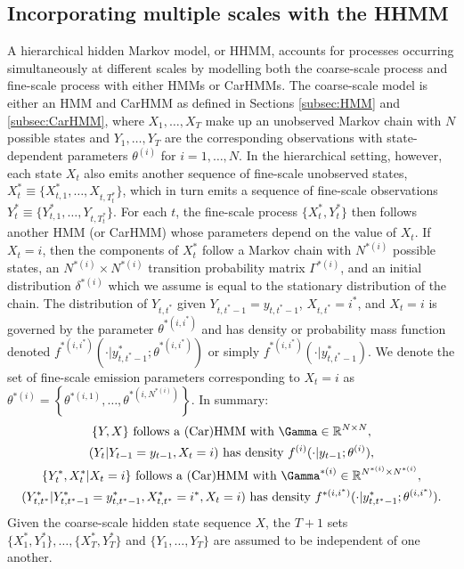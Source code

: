 \subsection{Incorporating multiple scales with the HHMM}
\label{subsec:HHMM}

A hierarchical hidden Markov model, or HHMM, accounts for processes occurring simultaneously at different scales by modelling both the coarse-scale process and fine-scale process with either HMMs \citep{Barajas:2017,Adam:2019} or CarHMMs. The coarse-scale model is either an HMM and CarHMM as defined in Sections \ref{subsec:HMM} and \ref{subsec:CarHMM}, where $X_1, \ldots, X_T$ make up an unobserved Markov chain with $N$ possible states and $Y_1,\ldots, Y_T$ are the corresponding observations with state-dependent parameters $\theta^{(i)}$ for $i = 1,\ldots,N$.   
%
In the hierarchical setting, however, each state $X_t$ also emits another sequence of fine-scale unobserved states, $X_t^* \equiv \{X_{t,1}^*,\ldots, X_{t,T_t^*}\}$, which in turn emits a sequence of fine-scale observations $Y_t^* \equiv \{Y_{t,1}^*,\ldots, Y_{t,T_t^*}\}$. For each $t$, the fine-scale process $\{X_t^*, Y_t^*\}$ then follows another HMM (or CarHMM) whose parameters depend on the value of $X_t$. If $X_t = i$, then the components of $X_t^*$ follow a Markov chain with $N^{*(i)}$ possible states, an $N^{*(i)} \times N^{*(i)}$ transition probability matrix $\Gamma^{*(i)}$, and an initial distribution $\delta^{*(i)}$ which we assume is equal to the stationary distribution of the chain. The distribution of $Y_{t,t^*}$ given $Y_{t,t^*-1} = y_{t,t^*-1}$, $X_{t,t^*}=i^*$, and $X_t=i$ is governed by the parameter $\theta^{*(i,i^*)}$ and has density or probability mass function denoted $f^{*(i,i^*)}\left(\cdot|y^*_{t,t^*-1}; \theta^{*(i,i^*)}\right)$ or simply $f^{*(i,i^*)}(\cdot|y^*_{t,t^*-1})$. We denote the set of fine-scale emission parameters corresponding to $X_t=i$ as $\theta^{*(i)}=\left\{\theta^{*(i,1)}, \ldots, \theta^{*\left(i,N^{*(i)}\right)}\right\}$. In summary:
%
%
\begin{gather*}
    \{Y, X\} \text{ follows a (Car)HMM with } \Gamma \in \bbR^{N \times N}, \\
    (Y_t | Y_{t-1} = y_{t-1}, X_t = i) \text{ has density } f^{(i)}(\cdot|y_{t-1};\theta^{(i)}), \\
    \{Y^*_t,X^*_t | X_t = i\} \text{ follows a (Car)HMM with } \Gamma^{*(i)} \in \bbR^{N^{*(i)} \times N^{*(i)}}, \\
    (Y^*_{t,t^*} | Y^*_{t,t^*-1} = y^*_{t,t^*-1}, X^*_{t,t^*} = i^*, X_t = i) \text{ has density } f^{*(i,i^*)}(\cdot|y^{*}_{t,t^*-1};\theta^{(i,i^*)}).
\end{gather*}
Given the coarse-scale hidden state sequence $X$, the $T+1$ sets $\{X_1^*, Y_1^*\}, \ldots, \{X_T^*, Y_T^*\}$ and $\{Y_1,\ldots,Y_T\}$ are assumed to be independent of one another.
%
%

